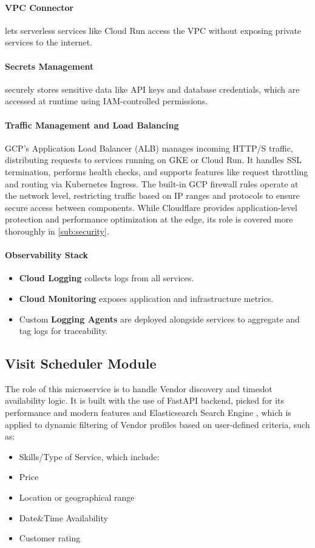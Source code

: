 \documentclass[11pt,a4paper]{article}
\begin{document}
\paragraph{VPC Connector} lets serverless services like Cloud Run
access the VPC without exposing private services to the internet.

\paragraph{Secrets Management} securely stores sensitive data like
API keys and database credentials, which are accessed at runtime
using IAM-controlled permissions.

\paragraph{Traffic Management and Load Balancing}

GCP’s Application Load Balancer (ALB) manages incoming HTTP/S
traffic, distributing requests to services running on GKE or Cloud
Run. It handles SSL termination, performs health checks, and supports
features like request throttling and routing via Kubernetes Ingress.
The built-in GCP firewall rules operate at the network level,
restricting traffic based on IP ranges and protocols to ensure secure
access between components. While Cloudflare provides
application-level protection and performance optimization at the
edge, its role is covered more thoroughly in \ref{sub:security}.

\paragraph{Observability Stack}

\begin{itemize}
  \item \textbf{Cloud Logging} collects logs from all services.
  \item \textbf{Cloud Monitoring} exposes application and
    infrastructure metrics.
  \item Custom \textbf{Logging Agents} are deployed alongside
    services to aggregate and tag logs for traceability.
\end{itemize}

\subsection{Visit Scheduler Module}
The role of this microservice is to handle Vendor discovery and
timeslot availability logic.
It is built with the use of FastAPI backend, picked for its
performance and modern features and Elasticsearch Search Engine
, which is applied to dynamic filtering of Vendor profiles based on
user-defined criteria, such as:
\begin{itemize}
  \item Skills/Type of Service, which include:
  \item Price
  \item Location or geographical range
  \item Date\&Time Availability
  \item Customer rating
\end{itemize}
\end{document}

